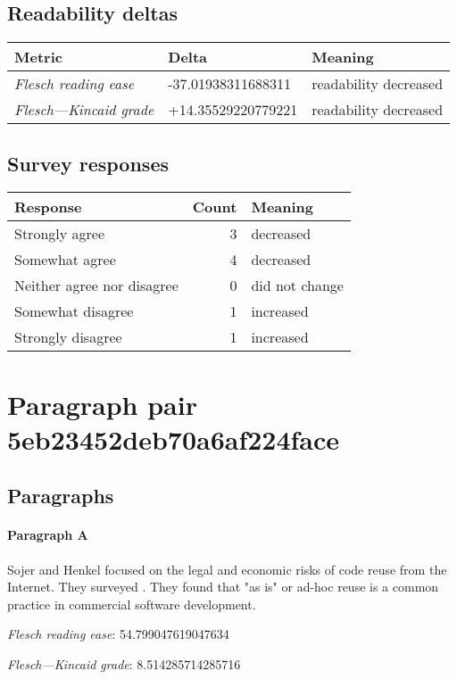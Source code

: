 \subsection{Readability deltas}

\begin{tabular}{lll}
\toprule
               \textbf{Metric} &      \textbf{Delta} &       \textbf{Meaning} \\
\midrule
    \emph{Flesch reading ease} &  -37.01938311688311 &  readability decreased \\
 \emph{Flesch---Kincaid grade} &  +14.35529220779221 &  readability decreased \\
\bottomrule
\end{tabular}

\subsection{Survey responses}
\begin{tabular}{lrl}
\toprule
          \textbf{Response} &  \textbf{Count} & \textbf{Meaning} \\
\midrule
             Strongly agree &               3 &        decreased \\
             Somewhat agree &               4 &        decreased \\
 Neither agree nor disagree &               0 &   did not change \\
          Somewhat disagree &               1 &        increased \\
          Strongly disagree &               1 &        increased \\
\bottomrule
\end{tabular}

\section{Paragraph pair 5eb23452deb70a6af224face}
\subsection{Paragraphs}
\paragraph{Paragraph A}
Sojer and Henkel focused on the legal and economic risks of code reuse from the Internet. They surveyed . They found that "as is" or ad-hoc reuse is a common practice in commercial software development.\par\medskip\emph{Flesch reading ease}: 54.799047619047634\par\emph{Flesch---Kincaid grade}: 8.514285714285716

